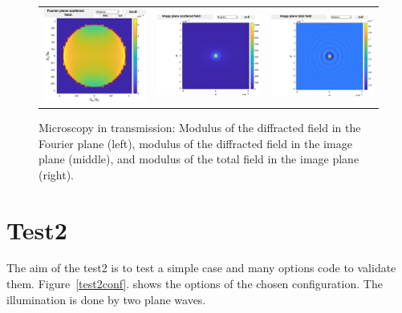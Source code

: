 \begin{figure}[H]
\begin{center}
\begin{tabular}{ccc}
  \includegraphics*[width=5.0cm,draft=false]{test1fourier.eps}
& \includegraphics*[width=5.0cm,draft=false]{test1image.eps}
&  \includegraphics*[width=5.0cm,draft=false]{test1imageinc.eps}
\end{tabular}

\end{center}
\caption{Microscopy in transmission: Modulus of the diffracted field
  in the Fourier plane (left), modulus of the diffracted field in the
  image plane (middle), and modulus of the total field in the image
  plane (right).}
\end{figure}

\section{Test2}

The aim of the test2 is to test a simple case and many options code to
validate them.  Figure~\ref{test2conf}. shows the options of the
chosen configuration. The illumination is done by two plane waves.


